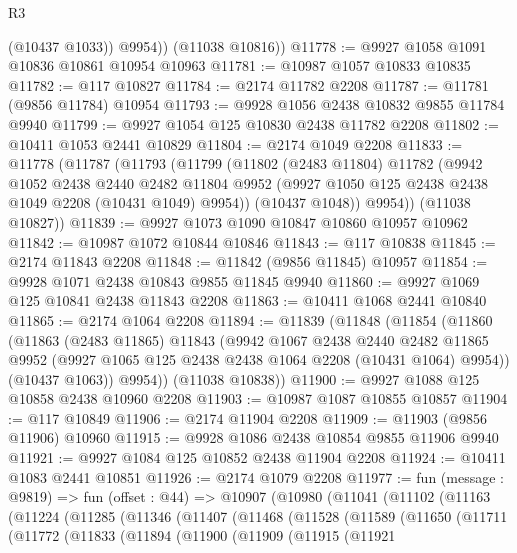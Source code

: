 \begin{lexlean}{R3}
\begin{coremodule}
            (@10437 @1033))
          @9954))
      (@11038 @10816))
@11778 := @9927 @1058 @1091 @10836 @10861 @10954 @10963
@11781 := @10987 @1057 @10833 @10835
@11782 := @117 @10827
@11784 := @2174 @11782 @2208
@11787 := @11781 (@9856 @11784) @10954
@11793 := @9928 @1056 @2438 @10832 @9855 @11784 @9940
@11799 := @9927 @1054 @125 @10830 @2438 @11782 @2208
@11802 := @10411 @1053 @2441 @10829
@11804 := @2174 @1049 @2208
@11833 := @11778
    (@11787
      (@11793
        (@11799
          (@11802
            (@2483 @11804)
            @11782
            (@9942
              @1052
              @2438
              @2440
              @2482
              @11804
              @9952
              (@9927 @1050 @125 @2438 @2438 @1049 @2208 (@10431 @1049) @9954))
            (@10437 @1048))
          @9954))
      (@11038 @10827))
@11839 := @9927 @1073 @1090 @10847 @10860 @10957 @10962
@11842 := @10987 @1072 @10844 @10846
@11843 := @117 @10838
@11845 := @2174 @11843 @2208
@11848 := @11842 (@9856 @11845) @10957
@11854 := @9928 @1071 @2438 @10843 @9855 @11845 @9940
@11860 := @9927 @1069 @125 @10841 @2438 @11843 @2208
@11863 := @10411 @1068 @2441 @10840
@11865 := @2174 @1064 @2208
@11894 := @11839
    (@11848
      (@11854
        (@11860
          (@11863
            (@2483 @11865)
            @11843
            (@9942
              @1067
              @2438
              @2440
              @2482
              @11865
              @9952
              (@9927 @1065 @125 @2438 @2438 @1064 @2208 (@10431 @1064) @9954))
            (@10437 @1063))
          @9954))
      (@11038 @10838))
@11900 := @9927 @1088 @125 @10858 @2438 @10960 @2208
@11903 := @10987 @1087 @10855 @10857
@11904 := @117 @10849
@11906 := @2174 @11904 @2208
@11909 := @11903 (@9856 @11906) @10960
@11915 := @9928 @1086 @2438 @10854 @9855 @11906 @9940
@11921 := @9927 @1084 @125 @10852 @2438 @11904 @2208
@11924 := @10411 @1083 @2441 @10851
@11926 := @2174 @1079 @2208
@11977 := fun (message : @9819) =>
  fun (offset : @44) =>
  @10907
    (@10980
      (@11041
        (@11102
          (@11163
            (@11224
              (@11285
                (@11346
                  (@11407
                    (@11468
                      (@11528
                        (@11589
                          (@11650
                            (@11711
                              (@11772
                                (@11833
                                  (@11894
                                    (@11900
                                      (@11909
                                        (@11915
                                          (@11921

\end{coremodule}
\end{lexlean}
